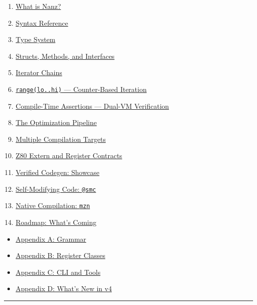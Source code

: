 \documentclass[
  11pt,
  a4paper,
]{report}
\providecommand{\tightlist}{%
  \setlength{\itemsep}{0pt}\setlength{\parskip}{0pt}}
\begin{document}
\begin{enumerate}
\def\labelenumi{\arabic{enumi}.}
\tightlist
\item
  \hyperref[chapter-1-what-is-nanz]{What is Nanz?}
\item
  \hyperref[chapter-2-syntax-reference]{Syntax Reference}
\item
  \hyperref[chapter-3-type-system]{Type System}
\item
  \hyperref[chapter-4-structs-methods-and-interfaces]{Structs, Methods,
  and Interfaces}
\item
  \hyperref[chapter-5-iterator-chains]{Iterator Chains}
\item
  \hyperref[chapter-6-range-counter-based-iteration]{\texttt{range(lo..hi)}
  --- Counter-Based Iteration}
\item
  \hyperref[chapter-7-compile-time-assertions]{Compile-Time Assertions
  --- Dual-VM Verification}
\item
  \hyperref[chapter-8-the-optimization-pipeline]{The Optimization
  Pipeline}
\item
  \hyperref[chapter-9-multiple-compilation-targets]{Multiple Compilation
  Targets}
\item
  \hyperref[chapter-10-z80-extern-and-register-contracts]{Z80 Extern and
  Register Contracts}
\item
  \hyperref[chapter-11-verified-codegen-showcase]{Verified Codegen:
  Showcase}
\item
  \hyperref[chapter-12-self-modifying-code-smc]{Self-Modifying Code:
  \texttt{@smc}}
\item
  \hyperref[chapter-13-native-compilation-mzn]{Native Compilation:
  \texttt{mzn}}
\item
  \hyperref[chapter-14-roadmap-whats-coming]{Roadmap: What's Coming}
\end{enumerate}

\begin{itemize}
\tightlist
\item
  \hyperref[appendix-a-grammar]{Appendix A: Grammar}
\item
  \hyperref[appendix-b-register-classes]{Appendix B: Register Classes}
\item
  \hyperref[appendix-c-cli-and-tools]{Appendix C: CLI and Tools}
\item
  \hyperref[appendix-d-whats-new-in-v4]{Appendix D: What's New in v4}
\end{itemize}

\begin{center}\rule{0.5\linewidth}{0.5pt}\end{center}
\end{document}
